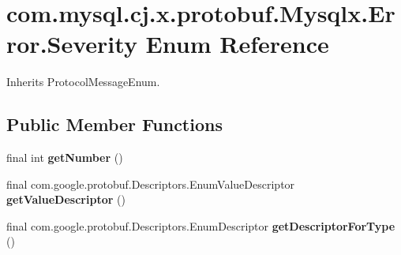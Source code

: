 \hypertarget{enumcom_1_1mysql_1_1cj_1_1x_1_1protobuf_1_1_mysqlx_1_1_error_1_1_severity}{}\section{com.\+mysql.\+cj.\+x.\+protobuf.\+Mysqlx.\+Error.\+Severity Enum Reference}
\label{enumcom_1_1mysql_1_1cj_1_1x_1_1protobuf_1_1_mysqlx_1_1_error_1_1_severity}


Inherits Protocol\+Message\+Enum.

\subsection*{Public Member Functions}
\begin{DoxyCompactItemize}
\item 
\mbox{\label{enumcom_1_1mysql_1_1cj_1_1x_1_1protobuf_1_1_mysqlx_1_1_error_1_1_severity_a0079b7f56a5d09d487ad060c3286ab1a}} 
final int {\bfseries get\+Number} ()
\item 
\mbox{\label{enumcom_1_1mysql_1_1cj_1_1x_1_1protobuf_1_1_mysqlx_1_1_error_1_1_severity_a5377cc3a4df307669fb76be2d461c04b}} 
final com.\+google.\+protobuf.\+Descriptors.\+Enum\+Value\+Descriptor {\bfseries get\+Value\+Descriptor} ()
\item 
\mbox{\label{enumcom_1_1mysql_1_1cj_1_1x_1_1protobuf_1_1_mysqlx_1_1_error_1_1_severity_ab8bb6219b499f95b85345b5effcdb903}} 
final com.\+google.\+protobuf.\+Descriptors.\+Enum\+Descriptor {\bfseries get\+Descriptor\+For\+Type} ()
\end{DoxyCompactItemize}
